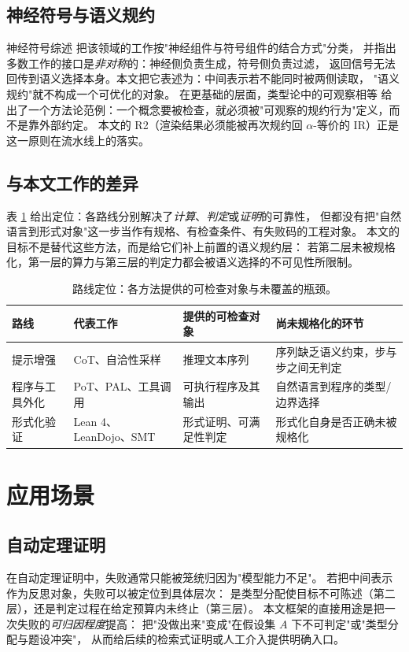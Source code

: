 \documentclass[11pt]{article}
\begin{document}
\subsection{神经符号与语义规约}
神经符号综述\cite{marra2024neurosymbolic} 把该领域的工作按"神经组件与符号组件的结合方式"分类，
并指出多数工作的接口是\emph{非对称}的：神经侧负责生成，符号侧负责过滤，
返回信号无法回传到语义选择本身。本文把它表述为：中间表示若不能同时被两侧读取，
"语义规约"就不构成一个可优化的对象。
在更基础的层面，类型论中的可观察相等\cite{altenkirch2007observational}
给出了一个方法论范例：一个概念要被检查，就必须被"可观察的规约行为"定义，而不是靠外部约定。
本文的 R2（渲染结果必须能被再次规约回 $\alpha$-等价的 IR）正是这一原则在流水线上的落实。

\subsection{与本文工作的差异}
\label{subsec:position}
表 \ref{tab:position} 给出定位：各路线分别解决了\emph{计算}、\emph{判定}或\emph{证明}的可靠性，
但都没有把"自然语言到形式对象"这一步当作有规格、有检查条件、有失败码的工程对象。
本文的目标不是替代这些方法，而是给它们补上前置的语义规约层：
若第二层未被规格化，第一层的算力与第三层的判定力都会被语义选择的不可见性所限制。

\begin{table}[t]
\centering
\small
\caption{路线定位：各方法提供的可检查对象与未覆盖的瓶颈。}
\label{tab:position}
\begin{tabular}{@{}p{2.5cm}p{3.5cm}p{3.4cm}p{4.4cm}@{}}
\toprule
路线 & 代表工作 & 提供的可检查对象 & 尚未规格化的环节 \\
\midrule
提示增强 & CoT、自洽性采样 & 推理文本序列 & 序列缺乏语义约束，步与步之间无判定 \\
程序与工具外化 & PoT、PAL、工具调用 & 可执行程序及其输出 & 自然语言到程序的类型/边界选择 \\
形式化验证 & Lean 4、LeanDojo、SMT & 形式证明、可满足性判定 & 形式化自身是否正确未被规格化 \\
\bottomrule
\end{tabular}
\end{table}

\section{应用场景}
\label{sec:applications}
\subsection{自动定理证明}
在自动定理证明中，失败通常只能被笼统归因为"模型能力不足"。
若把中间表示作为反思对象，失败可以被定位到具体层次：
是类型分配使目标不可陈述（第二层），还是判定过程在给定预算内未终止（第三层）。
本文框架的直接用途是把一次失败的\emph{可归因程度}提高：
把"没做出来"变成"在假设集 $A$ 下不可判定"或"类型分配与题设冲突"，
从而给后续的检索式证明或人工介入提供明确入口。
\end{document}
